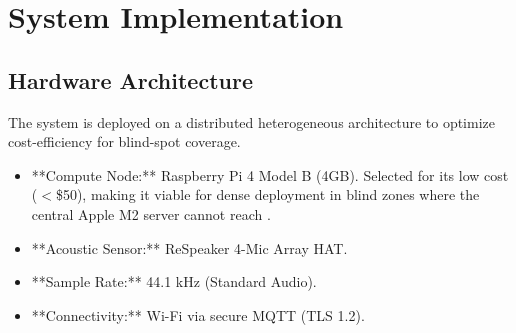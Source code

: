 \documentclass[conference]{IEEEtran}
\begin{document}
\section{System Implementation}

\begin{center}
\end{center}

\subsection{Hardware Architecture}
The system is deployed on a distributed heterogeneous architecture to optimize cost-efficiency for blind-spot coverage.
\begin{itemize}
    \item **Compute Node:** Raspberry Pi 4 Model B (4GB). Selected for its low cost ($<$\$50), making it viable for dense deployment in blind zones where the central Apple M2 server cannot reach \cite{b26}.
    \item **Acoustic Sensor:** ReSpeaker 4-Mic Array HAT.
    \item **Sample Rate:** 44.1 kHz (Standard Audio).
    \item **Connectivity:** Wi-Fi via secure MQTT (TLS 1.2).
\end{itemize}
\end{document}
